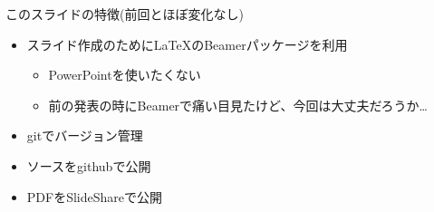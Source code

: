 \begin{frame}{このスライドの特徴(前回とほぼ変化なし)}
 \begin{itemize}
  \item スライド作成のために\LaTeX のBeamerパッケージを利用
        \begin{itemize}
         \item PowerPointを使いたくない
         \item 前の発表の時にBeamerで痛い目見たけど、今回は大丈夫だろうか…
        \end{itemize}
  \item gitでバージョン管理
  \item ソースをgithubで公開
  \item PDFをSlideShareで公開
 \end{itemize}
\end{frame}
